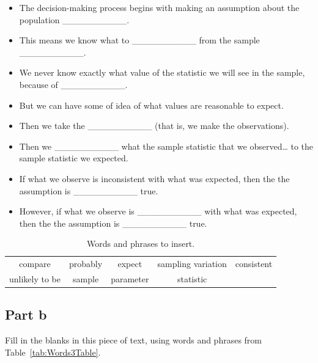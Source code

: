 \documentclass[
  11pt,
  a4paper,
  krantz2]{krantz}
\makeatletter
\providecommand{\tightlist}{%
  \setlength{\itemsep}{0pt}\setlength{\parskip}{0pt}}
\renewenvironment{quote}%
{\begin{kframe}}
{\end{kframe}}
\newenvironment{kframe}{%
\medskip{}
\setlength{\fboxsep}{.8em}
 \def\at@end@of@kframe{}%
 \ifinner\ifhmode%
  \def\at@end@of@kframe{\end{minipage}}%
  \begin{minipage}{\columnwidth}%
 \fi\fi%
 \def\FrameCommand##1{\hskip\@totalleftmargin \hskip-\fboxsep
 \colorbox{shadecolor}{##1}\hskip-\fboxsep
     \hskip-\linewidth \hskip-\@totalleftmargin \hskip\columnwidth}%
 \MakeFramed {\advance\hsize-\width
   \@totalleftmargin\z@ \linewidth\hsize
   \@setminipage}}%
 {\par\unskip\endMakeFramed%
 \at@end@of@kframe}
\renewenvironment{quote}
               {\list{}{\vspace{-0.5em}\begin{kframe}\small%
                        \rightmargin   \leftmargin
                        \parsep        \z@ \@plus\p@}%
                \item\relax}
               {\end{kframe}\endlist}
\makeatother
\begin{document}
\begin{quote}
\begin{itemize}
\tightlist
\item
  The decision-making process begins with making an assumption about the population \_\_\_\_\_\_\_\_\_\_.\\
\item
  This means we know what to \_\_\_\_\_\_\_\_\_\_ from the sample \_\_\_\_\_\_\_\_\_\_.\\
\item
  We never know exactly what value of the statistic we will see in the sample, because of \_\_\_\_\_\_\_\_\_\_.\\
\item
  But we can have some of idea of what values are reasonable to expect.\\
\item
  Then we take the \_\_\_\_\_\_\_\_\_\_ (that is, we make the observations).\\
\item
  Then we \_\_\_\_\_\_\_\_\_\_ what the sample statistic that we observed\ldots{} to the sample statistic we expected.\\
\item
  If what we observe is inconsistent with what was expected, then the the assumption is \_\_\_\_\_\_\_\_\_\_ true.\\
\item
  However, if what we observe is \_\_\_\_\_\_\_\_\_\_ with what was expected, then the the assumption is \_\_\_\_\_\_\_\_\_\_ true.
\end{itemize}
\end{quote}

\begin{table}
\centering
\caption{\label{tab:Words1Table}Words and phrases to insert.}
\centering
\fontsize{10}{12}\selectfont
\begin{tabular}[t]{ccccc}
\toprule
compare & probably & expect & sampling variation & consistent\\
unlikely to be & sample & parameter & statistic & \\
\bottomrule
\end{tabular}
\end{table}

\subsection{Part b}\label{part-b}

Fill in the blanks in this piece of text,
using words and phrases from Table~\ref{tab:Words3Table}.
\end{document}
